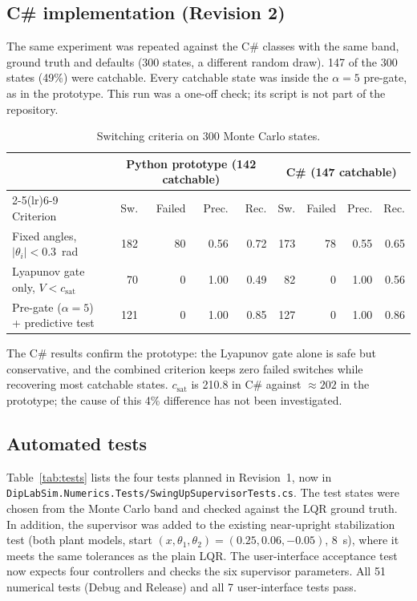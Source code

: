 \documentclass[11pt,a4paper]{article}
\newcommand{\code}[1]{\texttt{#1}}
\newcommand{\csat}{c_{\mathrm{sat}}}
\begin{document}
\subsection{C\# implementation (Revision 2)}
The same experiment was repeated against the C\# classes with the same band, ground truth and
defaults (300 states, a different random draw). 147 of the 300 states (49\%) were catchable.
Every catchable state was inside the $\alpha = 5$ pre-gate, as in the prototype. This run was a
one-off check; its script is not part of the repository.

\begin{table}[h]
\centering
\begin{tabular}{@{}l rrrr rrrr@{}}
\toprule
 & \multicolumn{4}{c}{Python prototype (142 catchable)} & \multicolumn{4}{c}{C\# (147 catchable)} \\
\cmidrule(lr){2-5}\cmidrule(lr){6-9}
Criterion & Sw. & Failed & Prec. & Rec. & Sw. & Failed & Prec. & Rec. \\
\midrule
Fixed angles, $|\theta_i| < 0.3$~rad & 182 & 80 & 0.56 & 0.72 & 173 & 78 & 0.55 & 0.65 \\
Lyapunov gate only, $V < \csat$ & 70 & 0 & 1.00 & 0.49 & 82 & 0 & 1.00 & 0.56 \\
Pre-gate ($\alpha = 5$) + predictive test & 121 & 0 & 1.00 & 0.85 & 127 & 0 & 1.00 & 0.86 \\
\bottomrule
\end{tabular}
\caption{Switching criteria on 300 Monte Carlo states.}
\label{tab:montecarlo}
\end{table}

The C\# results confirm the prototype: the Lyapunov gate alone is safe but conservative, and the
combined criterion keeps zero failed switches while recovering most catchable states. $\csat$ is
210.8 in C\# against $\approx 202$ in the prototype; the cause of this 4\% difference has not
been investigated.

\subsection{Automated tests}
Table~\ref{tab:tests} lists the four tests planned in Revision~1, now in
\code{DipLabSim.Numerics.Tests/SwingUpSupervisorTests.cs}. The test states were chosen from the
Monte Carlo band and checked against the LQR ground truth. In addition, the supervisor was added
to the existing near-upright stabilization test (both plant models, start
$(x,\theta_1,\theta_2) = (0.25, 0.06, -0.05)$, 8~s), where it meets the same tolerances as the
plain LQR. The user-interface acceptance test now expects four controllers and checks the six
supervisor parameters. All 51 numerical tests (Debug and Release) and all 7 user-interface tests
pass.
\end{document}
